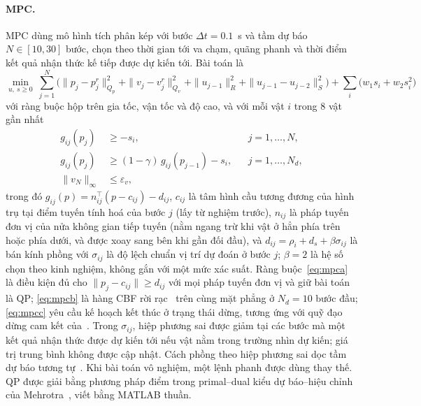 \documentclass[11pt,a4paper]{article}
\theoremstyle{plain}
\theoremstyle{definition}
\theoremstyle{remark}
\begin{document}
\paragraph{MPC.} MPC dùng mô hình tích phân kép với bước $\Delta t = 0.1$~s và tầm dự báo $N\in[10,30]$ bước, chọn theo thời gian tới va chạm, quãng phanh và thời điểm kết quả nhận thức kế tiếp được dự kiến tới. Bài toán là
\begin{equation}\label{eq:mpc}
\min_{u,\ s\ge0}\ \sum_{j=1}^{N}\Big(\|p_j - p_j^r\|^2_{Q_p} + \|v_j - v_j^r\|^2_{Q_v} + \|u_{j-1}\|^2_{R} + \|u_{j-1} - u_{j-2}\|^2_{S}\Big) + \sum_i\big(w_1 s_i + w_2 s_i^2\big)
\end{equation}
với ràng buộc hộp trên gia tốc, vận tốc và độ cao, và với mỗi vật $i$ trong 8 vật gần nhất
\begin{subequations}\label{eq:mpccon}
\begin{align}
g_{ij}(p_j) &\ge -s_i, && j = 1,\dots,N, \label{eq:mpca}\\
g_{ij}(p_j) &\ge (1-\gamma)\,g_{ij}(p_{j-1}) - s_i, && j = 1,\dots,N_d, \label{eq:mpcb}\\
\|v_N\|_\infty &\le \varepsilon_v, \label{eq:mpcc}
\end{align}
\end{subequations}
trong đó $g_{ij}(p) = n_{ij}^\top(p - c_{ij}) - d_{ij}$, $c_{ij}$ là tâm hình cầu tương đương của hình trụ tại điểm tuyến tính hoá của bước $j$ (lấy từ nghiệm trước), $n_{ij}$ là pháp tuyến đơn vị của nửa không gian tiếp tuyến (nằm ngang trừ khi vật ở hẳn phía trên hoặc phía dưới, và được xoay sang bên khi gần đối đầu), và $d_{ij} = \rho_i + d_s + \beta\sigma_{ij}$ là bán kính phồng với $\sigma_{ij}$ là độ lệch chuẩn vị trí dự đoán ở bước $j$; $\beta = 2$ là hệ số chọn theo kinh nghiệm, không gắn với một mức xác suất. Ràng buộc~\eqref{eq:mpca} là điều kiện đủ cho $\|p_j - c_{ij}\| \ge d_{ij}$ với mọi pháp tuyến đơn vị và giữ bài toán là QP; \eqref{eq:mpcb} là hàng CBF rời rạc~\cite{zeng2021} trên cùng mặt phẳng ở $N_d = 10$ bước đầu; \eqref{eq:mpcc} yêu cầu kế hoạch kết thúc ở trạng thái dừng, tương ứng với quỹ đạo dừng cam kết của~\cite{liu2016}. Trong $\sigma_{ij}$, hiệp phương sai được giảm tại các bước mà một kết quả nhận thức được dự kiến tới nếu vật nằm trong trường nhìn dự kiến; giá trị trung bình không được cập nhật. Cách phồng theo hiệp phương sai dọc tầm dự báo tương tự~\cite{zhu2019}. Khi bài toán vô nghiệm, một lệnh phanh được dùng thay thế. QP được giải bằng phương pháp điểm trong primal--dual kiểu dự báo--hiệu chỉnh của Mehrotra~\cite{mehrotra1992}, viết bằng MATLAB thuần.
\end{document}
